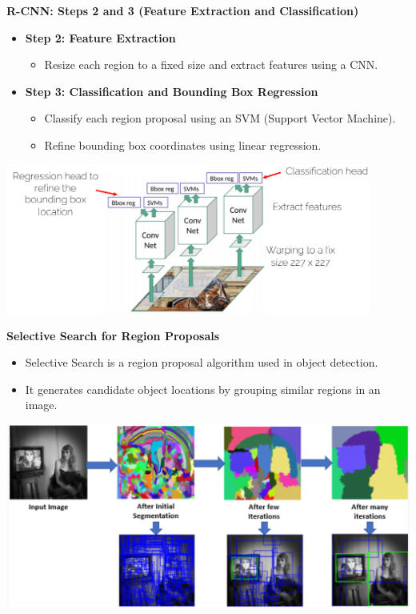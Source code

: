 \documentclass{beamer}
\begin{document}
\begin{frame}{\textbf{R-CNN: Steps 2 and 3 (Feature Extraction and Classification)}}
    \begin{itemize}
        \item \textbf{Step 2: Feature Extraction}
        \begin{itemize}
            \item Resize each region to a fixed size and extract features using a CNN.
        \end{itemize}
        
        \item \textbf{Step 3: Classification and Bounding Box Regression}
        \begin{itemize}
            \item Classify each region proposal using an SVM (Support Vector Machine).
            \item Refine bounding box coordinates using linear regression.
        \end{itemize}
    \end{itemize}
    \begin{center}
        \includegraphics[width=0.9\textwidth]{slide7.png} %
    \end{center}
\end{frame}


\begin{frame}{\textbf{Selective Search for Region Proposals}}
    \begin{itemize}
        \item Selective Search is a region proposal algorithm used in object detection.
        \item It generates candidate object locations by grouping similar regions in an image.
    \end{itemize}
    \begin{center}
        \includegraphics[width=1\textwidth]{slide8.png} %
    \end{center}
\end{frame}
\end{document}
